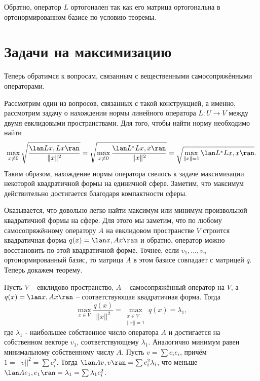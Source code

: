 Обратно, оператор $L$ ортогонален так как его матрица ортогональна в ортонормированном базисе по условию теоремы. 
\endproof













\section{Задачи на максимизацию}

Теперь обратимся к вопросам, связанным с вещественными самосопряжёнными операторами.

Рассмотрим один из вопросов, связанных с такой конструкцией, а именно, рассмотрим задачу о нахождении нормы линейного оператора $L \colon U \to V$ между двумя евклидовыми пространствами. Для того, чтобы найти  норму необходимо найти
$$\max_{x\neq 0}\sqrt{\frac{\lan Lx,Lx\ran}{\|x\|^2}}=\sqrt{\max_{x\neq 0}\frac{\lan L^*Lx,x\ran}{\|x\|^2}}=\sqrt{\max_{\|x\|=1} \lan L^*Lx,x\ran}.$$
Таким образом, нахождение нормы оператора свелось к задаче максимизации некоторой квадратичной формы на единичной сфере. Заметим, что максимум действительно достигается благодаря компактности сферы.

Оказывается, что довольно легко найти максимум или минимум произвольной квадратичной формы на сфере. Для этого мы заметим, что по любому самосопряжённому оператору $A$ на евклидовом пространстве $V$ строится квадратичная форма $q(x)=\lan x, Ax\ran$ и обратно, оператор можно восстановить по этой квадратичной форме. Точнее, если $v_1,\dots,v_n$ -- ортонормированный базис, то матрица $A$ в этом базисе совпадает с матрицей $q$. Теперь докажем теорему.



\thrm Пусть $V$ -- евклидово пространство, $A$ -- самосопряжённый оператор на $V$, а $q(x)=\lan x,Ax\ran$ -- соответствующая квадратичная форма. Тогда 
$$\max_{ x\in V } \frac{q(x)}{||x||^2}=\max_{\substack{ x\in V \\ ||x||=1}} q(x)=\lambda_1,$$
где $\lambda_1$ - наибольшее собственное число оператора $A$ и достигается на собственном векторе $v_1$, соответствующему $\lambda_1$. Аналогично минимум равен минимальному собственному числу $A$. 
\proof
Пусть $v=\sum c_i e_i$, причём $1=||v||^2=\sum c_i^2$. Тогда $\lan Av,v\ran = \sum c^2_i \lambda_i $, что меньше $\lan A e_1,e_1\ran= \lambda_1= \sum \lambda_1 c_i^2$.
\endproof
\ethrm

